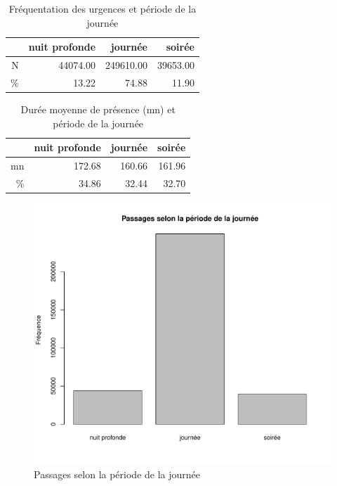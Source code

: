 \documentclass[12pt,english,french,twoside]{book}\usepackage[]{graphicx}\usepackage[]{color}
\makeatletter
\def\maxwidth{ %
  \ifdim\Gin@nat@width>\linewidth
    \linewidth
  \else
    \Gin@nat@width
  \fi
}
\newenvironment{knitrout}{}{} %
\makeatother
\begin{document}
\begin{table}[ht]
\centering
\begin{tabular}{rrrr}
  \hline
 & nuit profonde & journée & soirée \\ 
  \hline
N & 44074.00 & 249610.00 & 39653.00 \\ 
  \% & 13.22 & 74.88 & 11.90 \\ 
   \hline
\end{tabular}
\caption[Fréquentation des SU et période]{Fréquentation des urgences et période de la journée} 
\label{tab:freq_periode}
\end{table}
\begin{table}[ht]
\centering
\begin{tabular}{rrrr}
  \hline
 & nuit profonde & journée & soirée \\ 
  \hline
mn & 172.68 & 160.66 & 161.96 \\ 
  \% & 34.86 & 32.44 & 32.70 \\ 
   \hline
\end{tabular}
\caption[Durée de présence et période]{Durée  moyenne de présence (mn) et période de la journée} 
\label{duree_periode}
\end{table}



\begin{figure}[ht!]
 \centering
\begin{knitrout}
\color{fgcolor}
\includegraphics[width=\maxwidth]{figure/bp_periode} 

\end{knitrout}

 \caption{Passages selon la période de la journée}
 \label{fig:bp_periode}
\end{figure}
\end{document}
